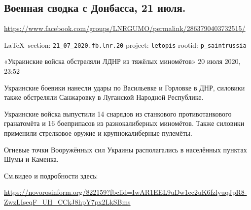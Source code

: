  
 
  
\subsection{Военная сводка с Донбасса, 21 июля.}
\url{https://www.facebook.com/groups/LNRGUMO/permalink/2863790403732515/}

\vspace{0.5cm}
{\small\LaTeX~section: \verb|21_07_2020.fb.lnr.20| project: \verb|letopis| rootid: \verb|p_saintrussia|}
\vspace{0.5cm}

«Украинские войска обстреляли ЛДНР из тяжёлых миномётов» 20 июля 2020, 23:52

Украинские боевики нанесли удары по Васильевке и Горловке в ДНР, силовики также
обстреляли Санжаровку в Луганской Народной Республике.

Украинские войска выпустили 14 снарядов из станкового противотанкового
гранатомёта и 16 боеприпасов из разнокалиберных миномётов.  Также силовики
применили стрелковое оружие и крупнокалиберные пулемёты.

Огневые точки Вооружённых сил Украины располагались в населённых пунктах Шумы и
Каменка.

См.видео и подробности здесь:

\url{https://novorosinform.org/822159?fbclid=IwAR1EEL9uDw1ec2uK6fzlyuqJpR8-ZwzLIseqF_UH_CCkJ8hpY7px2LkSBms}
  
